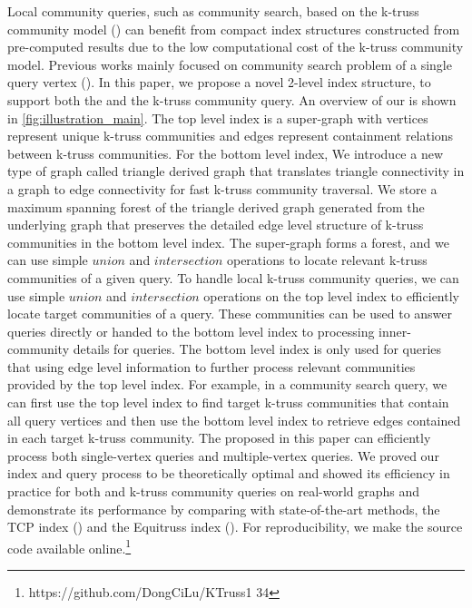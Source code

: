 Local community queries, such as community search, based on the k-truss community model (\cite{huang2014querying}) can benefit from compact index structures constructed from pre-computed results due to the low computational cost of the k-truss community model. Previous works mainly focused on community search problem of a single query vertex (\cite{huang2014querying, akbas2017truss}). In this paper, we propose a novel 2-level index structure, to support both the \toplevelprob{} and the \bottomlevelprob{} k-truss community query. An overview of our \twolevelindex{} is shown in \autoref{fig:illustration_main}. The top level index is a super-graph with vertices represent unique k-truss communities and edges represent containment relations between k-truss communities. For the bottom level index, We introduce a new type of graph called triangle derived graph that translates triangle connectivity in a graph to edge connectivity for fast k-truss community traversal. We store a maximum spanning forest of the triangle derived graph generated from the underlying graph that preserves the detailed edge level structure of k-truss communities in the bottom level index. 
The super-graph forms a forest, and we can use simple $union$ and $intersection$ operations to locate relevant k-truss communities of a given query. 
To handle local k-truss community queries, we can use simple $union$ and $intersection$ operations on the top level index to efficiently locate target communities of a query. These communities can be used to answer \toplevelprob{} queries directly or handed to the bottom level index to processing inner-community details for \bottomlevelprob{} queries. The bottom level index is only used for \bottomlevelprob{} queries that using edge level information to further process relevant communities provided by the top level index. For example, in a community search query, we can first use the top level index to find target k-truss communities that contain all query vertices and then use the bottom level index to retrieve edges contained in each target k-truss community. The \twolevelindex{} proposed in this paper can efficiently process both single-vertex queries and multiple-vertex queries. We proved our index and query process to be theoretically optimal and showed its efficiency in practice for both \toplevelprob{} and \bottomlevelprob{} k-truss community queries on real-world graphs and demonstrate its performance by comparing with state-of-the-art methods, the TCP index (\cite{huang2014querying}) and the Equitruss index (\cite{akbas2017truss}). For reproducibility, we make the source code available online.\footnote{https://github.com/DongCiLu/KTruss1 34}

